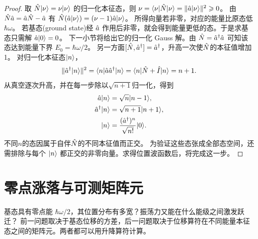 \begin{proof}
    取 $\hat{N}\lvert\nu\rangle = \nu\lvert\nu\rangle$ 的归一化本征态，则 $\nu = \langle\nu\vert\hat{N}\vert\nu\rangle = \|\hat{a}\lvert\nu\rangle\|^2 \geqslant 0$。
    由 $\hat{N}\hat{a} = \hat{a}\hat{N} - \hat{a}$ 有
    $\hat{N}(\hat{a}\lvert\nu\rangle) = (\nu - 1)\hat{a}\lvert\nu\rangle$。
    所得向量若非零，对应的能量比原态低 $\hbar\omega$。
    若基态(ground state)经 $\hat{a}$ 作用后非零，就会得到能量更低的态。于是求基态只需解 $\hat{a}\lvert0\rangle = 0$。
    下一小节将给出它的归一化 Gauss 解。由 $\hat{N} = \hat{a}^\dagger\hat{a}$ 可知该态达到能量下界 $E_0 = \hbar\omega/2$。
    另一方面$[\hat{N},\hat{a}^\dagger] = \hat{a}^\dagger$，升高一次使$\hat{N}$的本征值增加1。
    对归一化本征态$\lvert n\rangle$，
    \begin{equation}
        \|\hat{a}^\dagger\lvert n\rangle\|^2
        = \langle n\vert\hat{a}\hat{a}^\dagger\vert n\rangle
        = \langle n\vert\hat{N} + \hat{I}\vert n\rangle = n + 1.
    \end{equation}
    从真空逐次升高，并在每一步除以$\sqrt{n + 1}$归一化，得到
    \begin{subequations}
        \begin{align}
            \hat{a}\lvert n\rangle &= \sqrt n\lvert n - 1\rangle,\\
            \hat{a}^\dagger\lvert n\rangle &= \sqrt{n + 1}\lvert n + 1\rangle,\\
            \lvert n\rangle &= \frac{(\hat{a}^\dagger)^n}{\sqrt{n!}}\lvert0\rangle.
        \end{align}
    \end{subequations}
    不同$n$的态因属于自伴$\hat{N}$的不同本征值而正交。
    为验证这些态张成全部态空间，还需排除与每个 $\lvert n\rangle$ 都正交的非零向量。求得位置波函数后，将完成这一步。
\end{proof}

\section{零点涨落与可测矩阵元}
基态具有零点能 $\hbar\omega/2$，其位置分布有多宽？振荡力又能在什么能级之间激发跃迁？
前一问题取决于基态位移的方差，后一问题取决于位移算符在不同能量本征态之间的矩阵元。两者都可以用升降算符计算。

